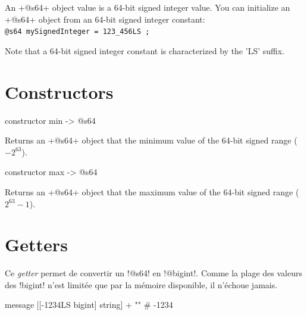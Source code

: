 



An \ggsq+@s64+ object value is a 64-bit signed integer value. You can initialize an \ggsq+@s64+ object from an 64-bit signed integer constant:\\

\texttt{@s64 mySignedInteger = 123\_456LS ;}

Note that a 64-bit signed integer constant is characterized by the 'LS' suffix.

\section{Constructors}



\begin{galgas4}
constructor min -> @s64
\end{galgas4}

Returns an \ggsq+@s64+ object that the minimum value of the 64-bit signed range ($-2^{63}$).






\begin{galgas4}
constructor max -> @s64
\end{galgas4}

Returns an \ggsq+@s64+ object that the maximum value of the 64-bit signed range ($2^{63}-1$).


\section{Getters}



Ce \emph{getter} permet de convertir un \ggsq!@s64! en \ggsq!@bigint!. Comme la plage des valeurs des \ggsq!bigint! n'est limitée que par la mémoire disponible, il n'échoue jamais.

\begin{galgas4}
  message [[-1234LS bigint] string] + "\n" # -1234
\end{galgas4}




